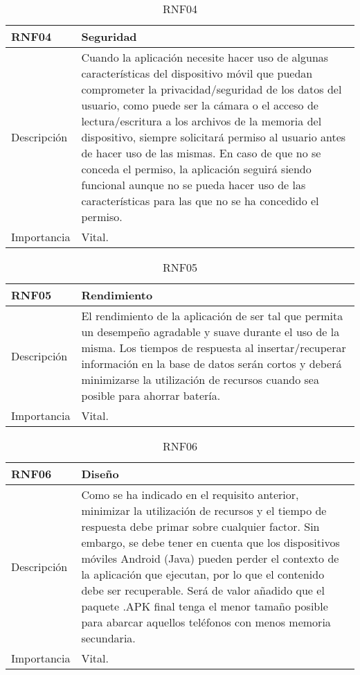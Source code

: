 \begin{table}[H]
\label{RNF04}
\begin{center}
\begin{tabular}{| l | p{10cm} |}
\hline
RNF04 & Seguridad\\
\hline
Descripción & Cuando la aplicación necesite hacer uso de algunas características del dispositivo móvil que puedan comprometer la privacidad/seguridad de los datos del usuario, como puede ser la cámara o el acceso de lectura/escritura a los archivos de la memoria del dispositivo, siempre solicitará permiso al usuario antes de hacer uso de las mismas. En caso de que no se conceda el permiso, la aplicación seguirá siendo funcional aunque no se pueda hacer uso de las características para las que no se ha concedido el permiso.\\
\hline
Importancia & Vital.\\
\hline
\end{tabular}
\end{center}
\caption{RNF04}
\end{table} 

\begin{table}[H]
\label{RNF05}
\begin{center}
\begin{tabular}{| l | p{10cm} |}
\hline
RNF05 & Rendimiento\\
\hline
Descripción & El rendimiento de la aplicación de ser tal que permita un desempeño agradable y suave durante el uso de la misma. Los tiempos de respuesta al insertar/recuperar información en la base de datos serán cortos y deberá minimizarse la utilización de recursos cuando sea posible para ahorrar batería.\\
\hline
Importancia & Vital.\\
\hline
\end{tabular}
\end{center}
\caption{RNF05}
\end{table}

\begin{table}[H]
\label{RNF06}
\begin{center}
\begin{tabular}{| l | p{10cm} |}
\hline
RNF06 & Diseño\\
\hline
Descripción & Como se ha indicado en el requisito anterior, minimizar la utilización de recursos y el tiempo de respuesta debe primar sobre cualquier factor. Sin embargo, se debe tener en cuenta que los dispositivos móviles Android (Java) pueden perder el contexto de la aplicación que ejecutan, por lo que el contenido debe ser recuperable. Será de valor añadido que el paquete .APK final tenga el menor tamaño posible para abarcar aquellos teléfonos con menos memoria secundaria.\\
\hline
Importancia & Vital.\\
\hline
\end{tabular}
\end{center}
\caption{RNF06}
\end{table}

